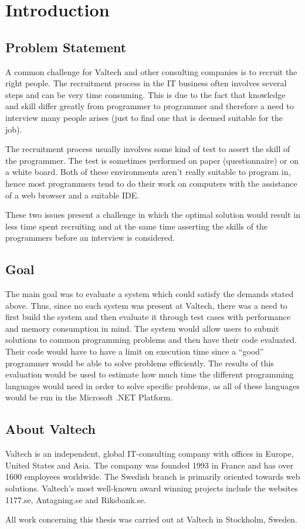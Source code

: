 \chapter{Introduction}

\section{Problem Statement}

A common challenge for Valtech and other consulting companies is to recruit the right people.  The recruitment process in the IT business often involves several steps and can be very time consuming. This is due to the fact that knowledge and skill differ greatly from programmer to programmer and therefore a need to interview many people arises (just to find one that is deemed suitable for the job). 

The recruitment process usually involves some kind of test to assert the skill of the programmer.  The test is sometimes performed on paper (questionnaire) or on a white board. Both of these environments aren’t really suitable to program in, hence most programmers tend to do their work on computers with the assistance of a web browser and a suitable IDE. 

These two issues present a challenge in which the optimal solution would result in less time spent recruiting and at the same time asserting the skills of the programmers before an interview is considered.

\section{Goal}
The main goal was to evaluate a system which could satisfy the demands stated above. Thus, since no such system was present at Valtech, there was a need to first build the system and then evaluate it through test cases with performance and memory consumption in mind. The system would allow users to submit solutions to common programming problems and then have their code evaluated. Their code would have to have a limit on execution time since a ``good'' programmer would be able to solve problems efficiently. The results of this evaluation would be used to estimate how much time the different programming languages would need in order to solve specific problems, as all of these languages would be run in the Microsoft .NET Platform.

\section{About Valtech}
Valtech is an independent, global IT-consulting company with offices in Europe, United States and Asia. The company was founded 1993 in France and has over 1600 employees worldwide. The Swedish branch is primarily oriented towards web solutions. 
Valtech's most well-known award winning projects include the websites 1177.se, Antagning.se and Riksbank.se. 

All work concerning this thesis was carried out at Valtech in Stockholm, Sweden.






